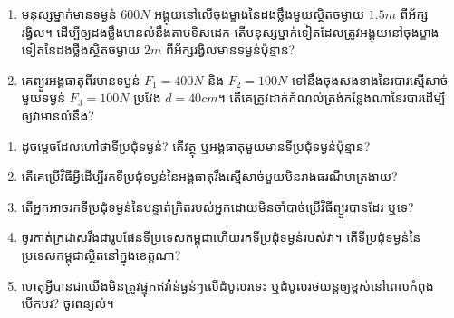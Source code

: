 \documentclass{officialexam}
\begin{document}
\begin{enumerate}[m]
\begin{multicols}{4}
		\end{multicols}
		\item មនុស្សម្នាក់មានទម្ងន់ $600N$ អង្គុយនៅលើចុងម្ខាងនៃដងថ្លឹងមួយស្ថិតចម្ងាយ $1.5m$ ពីអ័ក្សរង្វិល។ ដើម្បីឲ្យដងថ្លឹងមានលំនឹងតាមទិសដេក តើមនុស្សម្នាក់ទៀតដែលត្រូវអង្គុយនៅចុងម្ខាងទៀតនៃដងថ្លឹងស្ថិតចម្ងាយ $2m$ ពីអ័ក្សរង្វិលមានទម្ងន់ប៉ុន្មាន?
		\item គេព្យួរអង្គធាតុពីរមានទម្ងន់ $F_1=400N$ និង $F_2=100N$ ទៅនឹងចុងសងខាងនៃរបារស្មើសាច់មួយទម្ងន់ $F_{3}=100N$ ប្រវែង $d=40cm$។ តើគេត្រូវដាក់កំណល់ត្រង់កន្លែងណានៃរបារដើម្បីឲ្យវាមានលំនឹង?
	\end{enumerate}\newpage
	\begin{enumerate}[m]
		\item ដូចម្តេចដែលហៅថាទីប្រជុំទម្ងន់? តើវត្ថុ ឬអង្គធាតុមួយមានទីប្រជុំទម្ងន់ប៉ុន្មាន?
		\item តើគេប្រើវិធីអ្វីដើម្បីរកទីប្រជុំទម្ងន់នៃអង្គធាតុរឹងស្មើសាច់មួយមិនរាងធរណីមាត្រងាយ?
		\item តើអ្នកអាចរកទីប្រជុំទម្ងន់នៃបន្ទាត់ក្រិតរបស់អ្នកដោយមិនចាំបាច់ប្រើវិធីព្យួរបានដែរ ឬទេ?
		\item ចូរកាត់ក្រដាសរឹងជារូបផែនទីប្រទេសកម្ពុជាហើយរកទីប្រជុំទម្ងន់របស់វា។ តើទីប្រជុំទម្ងន់នៃប្រទេសកម្ពុជាស្ថិតនៅក្នុងខេត្តណា?
		\item ហេតុអ្វីបានជាយើងមិនត្រូវផ្ទុកឥវ៉ាន់ធ្ងន់ៗលើដំបូលរទេះ ឬដំបូលរថយន្តឲ្យខ្ពស់នៅពេលកំពុងបើកបរ? ចូរពន្យល់។
	\end{enumerate}
\end{document}
